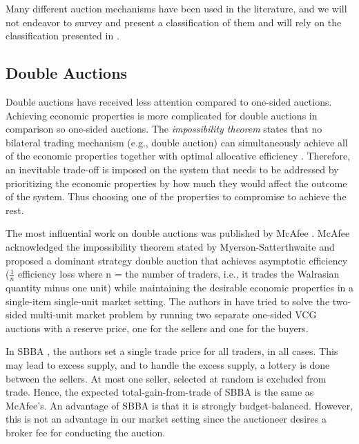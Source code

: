 Many different auction mechanisms have been used in the literature, and we will not endeavor to survey and present a classification of them and will rely on the classification presented in \cite{6365159}.

\subsection{Double Auctions}
Double auctions have received less attention compared to one-sided auctions. Achieving economic properties is more complicated for double auctions in comparison so one-sided auctions. The \textit{impossibility theorem} states that no bilateral trading mechanism (e.g., double auction) can simultaneously achieve all of the economic properties together with optimal allocative efficiency \cite{6214017}. Therefore, an inevitable trade-off is imposed on the system that needs to be addressed by prioritizing the economic properties by how much they would affect the outcome of the system. Thus choosing one of the properties to compromise to achieve the rest.


The most influential work on double auctions was published by McAfee \cite{MCAFEE1992434}. McAfee acknowledged the impossibility theorem stated by Myerson-Satterthwaite \cite{MYERSON1983265} and proposed a dominant strategy double auction that achieves asymptotic efficiency ($\frac{1}{n}$ efficiency loss where n = the number of traders, i.e., it trades the Walrasian quantity minus one unit) while maintaining the desirable economic properties in a single-item single-unit market setting. The authors in \cite{Loertscher14amulti-unit} have tried to solve the two-sided multi-unit market problem by running two separate one-sided \ac{VCG} auctions with a reserve price, one for the sellers and one for the buyers.


In SBBA \cite{SBBA}, the authors set a single trade price for all traders, in all cases. This may lead to excess supply, and to handle the excess supply, a lottery is done between the sellers. At most one seller, selected at random is excluded from trade. Hence, the expected total-gain-from-trade of SBBA is the same as McAfee's. An advantage of SBBA is that it is strongly budget-balanced. However, this is not an advantage in our market setting since the auctioneer desires a broker fee for conducting the auction.

